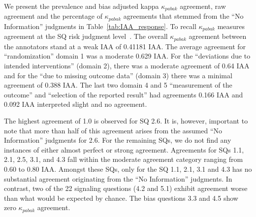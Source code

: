 \documentclass[sn-mathphys,Numbered]{sn-jnl}%
\theoremstyle{thmstyleone}%
\theoremstyle{thmstyletwo}%
\theoremstyle{thmstylethree}%
\begin{document}
We present the prevalence and bias adjusted kappa $\kappa_{pabak}$ agreement, raw agreement and the percentage of $\kappa_{pabak}$ agreements
that stemmed from the ``No Information'' judgments in Table~\ref{tab:IAA_response}.
To recall $\kappa_{pabak}$ measures agreement at the SQ risk judgment level~\cite{mchugh2012interrater}.
The overall $\kappa_{pabak}$ agreement between the annotators stand at a weak IAA of 0.41181 IAA.
The average agreement for ``randomization'' domain 1 was a moderate 0.629 IAA.
For the ``deviations due to intended interventions'' (domain 2), there was a moderate agreement of 0.64 IAA and for the ``due to missing outcome data'' (domain 3) there was a minimal agreement of 0.388 IAA.
The last two domain 4 and 5 ``measurement of the outcome'' and ``selection of the reported result'' had agreements 0.166 IAA and 0.092 IAA interpreted slight and no agreement.



The highest agreement of 1.0 is observed for SQ 2.6.
It is, however, important to note that more than half of this agreement arises from the assumed ``No Information'' judgments for 2.6.
For the remaining SQs, we do not find any instances of either almost perfect or strong agreement.
Agreements for SQs 1.1, 2.1, 2.5, 3.1, and 4.3 fall within the moderate agreement category ranging from 0.60 to 0.80 IAA.
Amongst these SQs, only for the SQ 1.1, 2.1, 3.1 and 4.3 has no substantial agreement originating from the ``No Information'' judgments.
In contrast, two of the 22 signaling questions (4.2 and 5.1) exhibit agreement worse than what would be expected by chance.
The bias questions 3.3 and 4.5 show zero $\kappa_{pabak}$ agreement.
\end{document}
